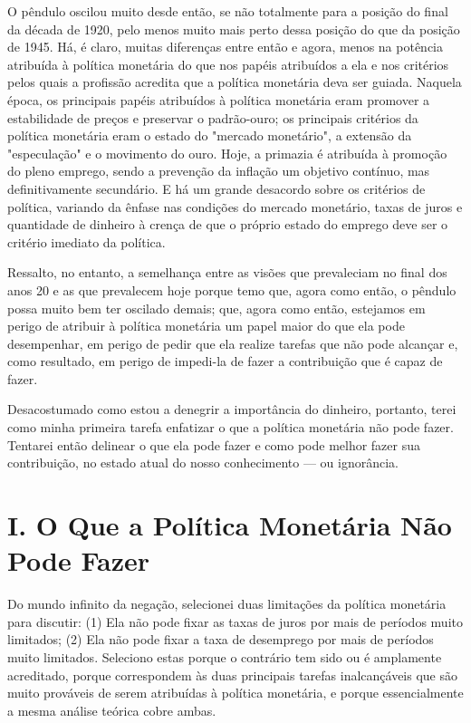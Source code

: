 \documentclass[12pt]{article}
\begin{document}
O pêndulo oscilou muito desde então, se não totalmente para a posição do final da década de 1920, pelo menos muito mais perto dessa posição do que da posição de 1945. Há, é claro, muitas diferenças entre então e agora, menos na potência atribuída à política monetária do que nos papéis atribuídos a ela e nos critérios pelos quais a profissão acredita que a política monetária deva ser guiada. Naquela época, os principais papéis atribuídos à política monetária eram promover a estabilidade de preços e preservar o padrão-ouro; os principais critérios da política monetária eram o estado do "mercado monetário", a extensão da "especulação" e o movimento do ouro. Hoje, a primazia é atribuída à promoção do pleno emprego, sendo a prevenção da inflação um objetivo contínuo, mas definitivamente secundário. E há um grande desacordo sobre os critérios de política, variando da ênfase nas condições do mercado monetário, taxas de juros e quantidade de dinheiro à crença de que o próprio estado do emprego deve ser o critério imediato da política.

Ressalto, no entanto, a semelhança entre as visões que prevaleciam no final dos anos 20 e as que prevalecem hoje porque temo que, agora como então, o pêndulo possa muito bem ter oscilado demais; que, agora como então, estejamos em perigo de atribuir à política monetária um papel maior do que ela pode desempenhar, em perigo de pedir que ela realize tarefas que não pode alcançar e, como resultado, em perigo de impedi-la de fazer a contribuição que é capaz de fazer.

Desacostumado como estou a denegrir a importância do dinheiro, portanto, terei como minha primeira tarefa enfatizar o que a política monetária não pode fazer. Tentarei então delinear o que ela pode fazer e como pode melhor fazer sua contribuição, no estado atual do nosso conhecimento — ou ignorância.

\section*{I. O Que a Política Monetária Não Pode Fazer}

Do mundo infinito da negação, selecionei duas limitações da política monetária para discutir: (1) Ela não pode fixar as taxas de juros por mais de períodos muito limitados; (2) Ela não pode fixar a taxa de desemprego por mais de períodos muito limitados. Seleciono estas porque o contrário tem sido ou é amplamente acreditado, porque correspondem às duas principais tarefas inalcançáveis que são muito prováveis de serem atribuídas à política monetária, e porque essencialmente a mesma análise teórica cobre ambas.
\end{document}
